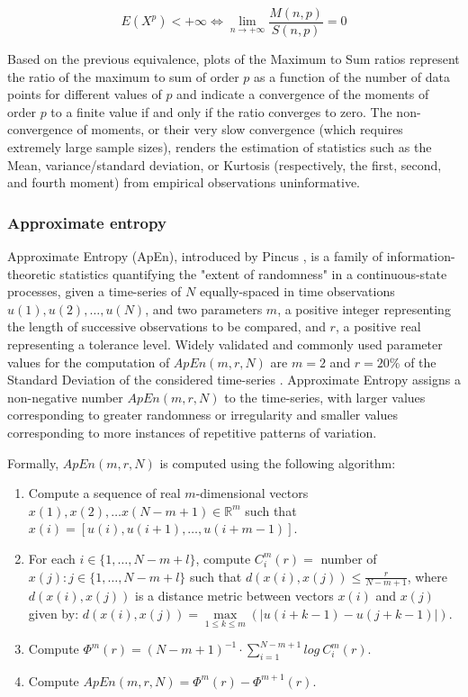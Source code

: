 \documentclass[12pt]{article}
\begin{document}
$$E(X^p)< +\infty \Leftrightarrow \lim_{n\to +\infty} \frac{M(n,p)}{S(n,p)}=0$$

Based on the previous equivalence, plots of the Maximum to Sum ratios represent the ratio  
of the maximum to sum of order $p$ as a function of the number of data points for different values of $p$ and indicate a convergence of the moments of order $p$ to a finite value if and only if the ratio converges to zero. The non-convergence of moments, or their very slow convergence (which requires extremely large sample sizes), renders the estimation of statistics such as the Mean, variance/standard deviation, or Kurtosis (respectively, the first, second, and fourth moment) from empirical observations uninformative. 


\subsubsection{Approximate entropy}
Approximate Entropy (ApEn), introduced by Pincus \cite{pincus91, pincus92, pincus04}, is a family of information-theoretic statistics quantifying the "extent of randomness"  in a continuous-state processes, given a time-series of $N$ equally-spaced in time observations $u(1),u(2),\dots,u(N)$, and two parameters $m$, a positive integer representing the length of successive observations to be compared, and $r$, a positive real representing a tolerance level. Widely validated and commonly used parameter values for the computation of $ApEn(m,r,N)$ are $m=2$ and $r=20\%$ of the Standard Deviation of the considered time-series \cite{pincus04}. Approximate Entropy assigns a non-negative number $ApEn(m,r,N)$ to the time-series, with larger values corresponding to greater randomness or irregularity and smaller values corresponding to more instances of repetitive patterns of variation. 

Formally, $ApEn(m,r,N)$ is computed using the following algorithm:
\begin{enumerate}
    \item Compute a sequence of real $m$-dimensional vectors $x(1),x(2),\dots x(N-m+1) \in  \mathbb{R}^m$ such that $x(i)=[u(i),u(i+1),\dots,u(i+m-1)]$.
    \item For each $i\in \{1,\dots,N-m+l\}$, compute $C_i^m(r)=$ number of $x(j):j\in \{1,\dots,N-m+l\}$ such that $d(x(i),x(j)) \leq \frac{r}{N-m+1}$, where $d(x(i),x(j))$ is a distance metric between vectors $x(i)$ and $x(j)$ given by: $d(x(i),x(j))=\max\limits_{1 \leq k \leq m}(|u(i+k-1)-u(j+k-1)|)$.
    \item Compute $\Phi^m(r)={(N-m+1)}^{-1}\cdot{\sum\limits_{i=1}^{N-m+1}log \: C_i^m(r)}$.
    \item Compute $ApEn(m,r,N)=\Phi^m(r) - \Phi^{m+1}(r).$  
\end{enumerate}
\end{document}
